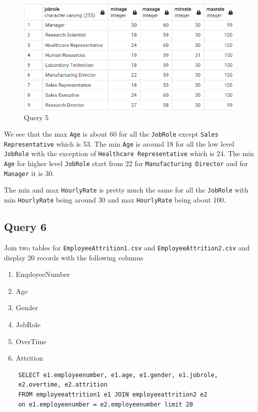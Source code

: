 \documentclass[12pt]{article}
\begin{document}
\begin{figure}[H]
    \centering
    \includegraphics[width=1\textwidth]{images/query5.png}
    \caption{Query 5}
    \label{fig:query5}
\end{figure}

We see that the max \texttt{Age} is about 60 for all the \texttt{JobRole}
except \texttt{Sales Representative} which is 53. The min \texttt{Age} is
around 18 for all the low level \texttt{JobRole} with the exception of
\texttt{Healthcare Representative} which is 24. The min \texttt{Age} for higher
level \texttt{JobRole} start from 22 for \texttt{Manufacturing Director} and
for \texttt{Manager} it is 30.

The min and max \texttt{HourlyRate} is pretty much the same for all the
\texttt{JobRole} with min \texttt{HourlyRate} being around 30 and max
\texttt{HourlyRate} being about 100.

\subsection{Query 6}
Join two tables for \texttt{EmployeeAttrition1.csv} and
\texttt{EmployeeAttrition2.csv} and display 20 records with the following
columns
\begin{enumerate}
    \item EmployeeNumber
    \item Age
    \item Gender
    \item JobRole
    \item OverTime
    \item Attrition
\end{enumerate}
\begin{verbatim}
    SELECT e1.employeenumber, e1.age, e1.gender, e1.jobrole,
    e2.overtime, e2.attrition
    FROM employeeattrition1 e1 JOIN employeeattrition2 e2
    on e1.employeenumber = e2.employeenumber limit 20
\end{verbatim}
\end{document}
